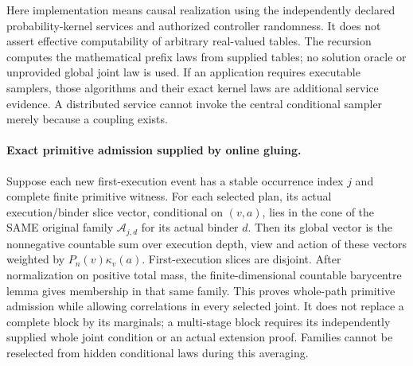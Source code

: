 \documentclass{article}
\begin{document}
Here implementation means causal realization using the independently declared probability-kernel services and authorized controller randomness. It does not assert effective computability of arbitrary real-valued tables. The recursion computes the mathematical prefix laws from supplied tables; no solution oracle or unprovided global joint law is used. If an application requires executable samplers, those algorithms and their exact kernel laws are additional service evidence. A distributed service cannot invoke the central conditional sampler merely because a coupling exists.

\paragraph{Exact primitive admission supplied by online gluing.}
Suppose each new first-execution event has a stable occurrence index $j$ and complete finite primitive witness. For each selected plan, its actual execution/binder slice vector, conditional on $(v,a)$, lies in the cone of the SAME original family $\mathcal A_{j,d}$ for its actual binder $d$. Then its global vector is the nonnegative countable sum over execution depth, view and action of these vectors weighted by $P_n(v)\kappa_v(a)$. First-execution slices are disjoint. After normalization on positive total mass, the finite-dimensional countable barycentre lemma gives membership in that same family. This proves whole-path primitive admission while allowing correlations in every selected joint. It does not replace a complete block by its marginals; a multi-stage block requires its independently supplied whole joint condition or an actual extension proof. Families cannot be reselected from hidden conditional laws during this averaging.
\end{document}
